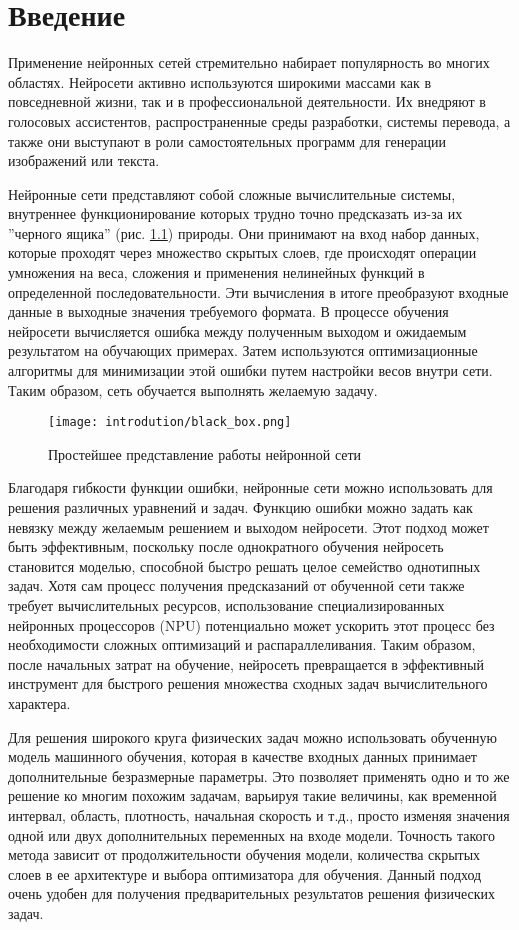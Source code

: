 \chapter{Введение}

Применение нейронных сетей стремительно набирает популярность во многих областях.
Нейросети активно используются широкими массами как в повседневной жизни, так и в
профессиональной деятельности. Их внедряют в голосовых ассистентов, распространенные
среды разработки, системы перевода, а также они выступают в роли самостоятельных
программ для генерации изображений или текста.

Нейронные сети представляют собой сложные вычислительные системы, внутреннее
функционирование которых трудно точно предсказать из-за их ''черного ящика''
(рис. \ref{fig:black_box}) природы. Они принимают на вход набор данных, которые
проходят через множество скрытых слоев, где происходят операции умножения на веса,
сложения и применения нелинейных функций в определенной последовательности.
Эти вычисления в итоге преобразуют входные данные в выходные значения требуемого
формата. В процессе обучения нейросети вычисляется ошибка между полученным выходом
и ожидаемым результатом на обучающих примерах. Затем используются оптимизационные 
алгоритмы для минимизации этой ошибки путем настройки весов внутри сети. 
Таким образом, сеть обучается выполнять желаемую задачу.

\begin{figure}[h]
    \texttt{[image: introdution/black\_box.png]}
    \caption{Простейшее представление работы нейронной сети}
    \label{fig:black_box}
\end{figure}

Благодаря гибкости функции ошибки, нейронные сети можно использовать для решения
различных уравнений и задач. Функцию ошибки можно задать как невязку между желаемым
решением и выходом нейросети. Этот подход может быть эффективным, поскольку после
однократного обучения нейросеть становится моделью, способной быстро решать целое
семейство однотипных задач. Хотя сам процесс получения предсказаний от обученной
сети также требует вычислительных ресурсов, использование специализированных нейронных
процессоров (NPU) потенциально может ускорить этот процесс без необходимости сложных
оптимизаций и распараллеливания. Таким образом, после начальных затрат на обучение,
нейросеть превращается в эффективный инструмент для быстрого решения множества сходных
задач вычислительного характера.

Для решения широкого круга физических задач можно использовать обученную модель машинного
обучения, которая в качестве входных данных принимает дополнительные безразмерные параметры.
Это позволяет применять одно и то же решение ко многим похожим задачам, варьируя такие
величины, как временной интервал, область, плотность, начальная скорость и т.д., просто
изменяя значения одной или двух дополнительных переменных на входе модели. Точность такого
метода зависит от продолжительности обучения модели, количества скрытых слоев в ее архитектуре
и выбора оптимизатора для обучения. Данный подход очень удобен для получения предварительных
результатов решения физических задач.